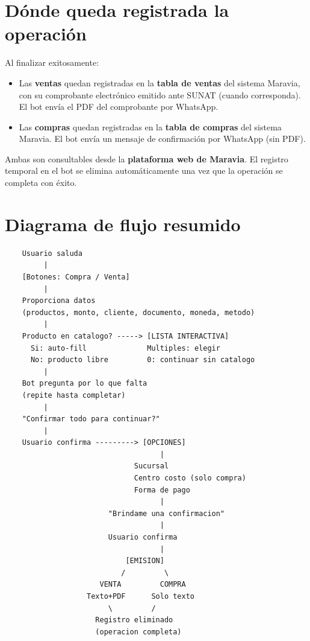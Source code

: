 \documentclass[12pt,a4paper]{article}
\begin{document}
\section{D\'onde queda registrada la operaci\'on}

Al finalizar exitosamente:

\begin{itemize}
    \item Las \textbf{ventas} quedan registradas en la \textbf{tabla de ventas} del sistema Maravia, con su comprobante electr\'onico emitido ante SUNAT (cuando corresponda). El bot env\'ia el PDF del comprobante por WhatsApp.
    \item Las \textbf{compras} quedan registradas en la \textbf{tabla de compras} del sistema Maravia. El bot env\'ia un mensaje de confirmaci\'on por WhatsApp (sin PDF).
\end{itemize}

Ambas son consultables desde la \textbf{plataforma web de Maravia}. El registro temporal en el bot se elimina autom\'aticamente una vez que la operaci\'on se completa con \'exito.

\section{Diagrama de flujo resumido}

\begin{center}
\begin{tcolorbox}[colback=gris, colframe=maravia, width=13cm]
\begin{verbatim}
    Usuario saluda
         |
    [Botones: Compra / Venta]
         |
    Proporciona datos
    (productos, monto, cliente, documento, moneda, metodo)
         |
    Producto en catalogo? -----> [LISTA INTERACTIVA]
      Si: auto-fill              Multiples: elegir
      No: producto libre         0: continuar sin catalogo
         |
    Bot pregunta por lo que falta
    (repite hasta completar)
         |
    "Confirmar todo para continuar?"
         |
    Usuario confirma ---------> [OPCIONES]
                                    |
                              Sucursal
                              Centro costo (solo compra)
                              Forma de pago
                                    |
                        "Brindame una confirmacion"
                                    |
                        Usuario confirma
                                    |
                            [EMISION]
                           /         \
                      VENTA         COMPRA
                   Texto+PDF      Solo texto
                        \         /
                     Registro eliminado
                     (operacion completa)
\end{verbatim}
\end{tcolorbox}
\end{center}
\end{document}
